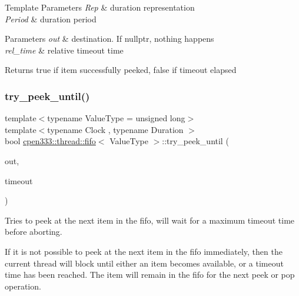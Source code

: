 \begin{DoxyTemplParams}{Template Parameters}
{\em Rep} & duration representation \\
\hline
{\em Period} & duration period \\
\hline
\end{DoxyTemplParams}

\begin{DoxyParams}{Parameters}
{\em out} & destination. If {\ttfamily nullptr}, nothing happens \\
\hline
{\em rel\+\_\+time} & relative timeout time \\
\hline
\end{DoxyParams}
\begin{DoxyReturn}{Returns}
{\ttfamily true} if item successfully peeked, {\ttfamily false} if timeout elapsed 
\end{DoxyReturn}
\mbox{\label{classcpen333_1_1thread_1_1fifo_a509aacf149e0a000ec3e8876ce2d2d93}} 
\subsubsection{\texorpdfstring{try\+\_\+peek\+\_\+until()}{try\_peek\_until()}}
{\footnotesize\ttfamily template$<$typename Value\+Type  = unsigned long$>$ \\
template$<$typename Clock , typename Duration $>$ \\
bool \hyperlink{classcpen333_1_1thread_1_1fifo}{cpen333\+::thread\+::fifo}$<$ Value\+Type $>$\+::try\+\_\+peek\+\_\+until (\begin{DoxyParamCaption}\item[{Value\+Type $\ast$}]{out,  }\item[{const std\+::chrono\+::time\+\_\+point$<$ Clock, Duration $>$ \&}]{timeout }\end{DoxyParamCaption})\hspace{0.3cm}{\ttfamily [inline]}}



Tries to peek at the next item in the fifo, will wait for a maximum timeout time before aborting. 

If it is not possible to peek at the next item in the fifo immediately, then the current thread will block until either an item becomes available, or a timeout time has been reached. The item will remain in the fifo for the next {\ttfamily peek} or {\ttfamily pop} operation.


